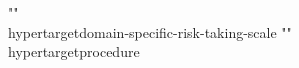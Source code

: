 {{{{{{{{{{""\\hypertarget{domain-specific-risk-taking-scale}{%
""\\hypertarget{procedure}{%
}}}}}}}}}}}}
